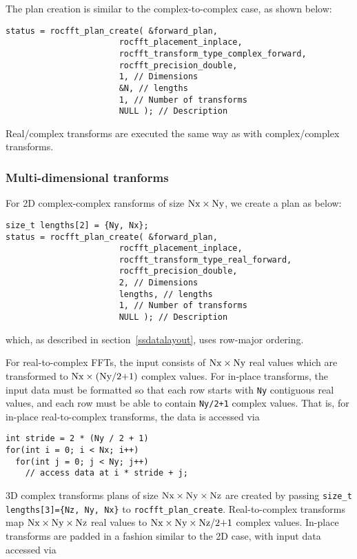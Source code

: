\documentclass[10pt]{article}
\renewcommand{\(}{\left(}
\renewcommand{\)}{\right)}
\begin{document}
The plan creation is similar to the complex-to-complex case, as shown
below:
\begin{lstlisting}
status = rocfft_plan_create( &forward_plan,
                       rocfft_placement_inplace,
                       rocfft_transform_type_complex_forward,
                       rocfft_precision_double,
                       1, // Dimensions
                       &N, // lengths
                       1, // Number of transforms
                       NULL ); // Description
\end{lstlisting}
Real/complex transforms are executed the same way as with
complex/complex transforms.

\subsubsection{Multi-dimensional tranforms}

For 2D complex-complex ransforms of size
$\text{\lstinline{Nx}}\times\text{\lstinline{Ny}}$, we create a plan
as below:
\begin{lstlisting}
size_t lengths[2] = {Ny, Nx};
status = rocfft_plan_create( &forward_plan,
                       rocfft_placement_inplace,
                       rocfft_transform_type_real_forward,
                       rocfft_precision_double,
                       2, // Dimensions
                       lengths, // lengths
                       1, // Number of transforms
                       NULL ); // Description
\end{lstlisting}
which, as described in section~\ref{ssdatalayout}, uses row-major
ordering.

For real-to-complex FFTs, the input consists of
$\text{\lstinline{Nx}}\times\text{\lstinline{Ny}}$ real values which
are transformed to
$\text{\lstinline{Nx}}\times(\text{\lstinline{Ny/2+1}})$ complex
values.  For in-place transforms, the input data must be formatted so
that each row starts with \lstinline{Ny} contiguous real values, and
each row must be able to contain \lstinline{Ny/2+1} complex values.
That is, for in-place real-to-complex transforms, the data is accessed
via
\begin{lstlisting}
int stride = 2 * (Ny / 2 + 1)
for(int i = 0; i < Nx; i++)
  for(int j = 0; j < Ny; j++)
    // access data at i * stride + j;
\end{lstlisting}

3D complex transforms plans of size
$\text{\lstinline{Nx}}\times\text{\lstinline{Ny}}\times\text{\lstinline{Nz}}$
are created by passing \lstinline|size_t lengths[3]={Nz, Ny, Nx}| to
\lstinline{rocfft_plan_create}.  Real-to-complex transforms map
$\text{\lstinline{Nx}}\times\text{\lstinline{Ny}}\times\text{\lstinline{Nz}}$
real values to
$\text{\lstinline{Nx}}\times\text{\lstinline{Ny}}\times\text{\lstinline{Nz/2+1}}$
complex values.  In-place transforms are padded in a fashion similar
to the 2D case, with input data accessed via
\end{document}
